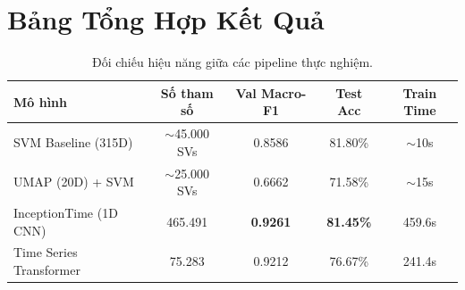 \documentclass[12pt,a4paper]{article}
\begin{document}
\section{Bảng Tổng Hợp Kết Quả}
\begin{table}[h]
\centering
\begin{tabular}{lcccc}
\toprule
\textbf{Mô hình} & \textbf{Số tham số} & \textbf{Val Macro-F1} & \textbf{Test Acc} & \textbf{Train Time} \\
\midrule
SVM Baseline (315D) & $\sim$45.000 SVs & 0.8586 & 81.80\% & $\sim$10s \\
UMAP (20D) + SVM & $\sim$25.000 SVs & 0.6662 & 71.58\% & $\sim$15s \\
InceptionTime (1D CNN) & 465.491 & \textbf{0.9261} & \textbf{81.45\%} & 459.6s \\
Time Series Transformer & 75.283 & 0.9212 & 76.67\% & 241.4s \\
\bottomrule
\end{tabular}
\caption{Đối chiếu hiệu năng giữa các pipeline thực nghiệm.}
\end{table}
\end{document}
